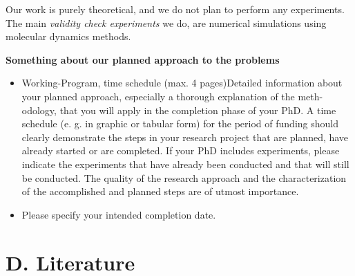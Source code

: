\documentclass[11pt, notitlepage]{article} %
\begin{document}
Our work is purely theoretical, and we do not plan to perform any experiments. The main \emph{validity check experiments} 
we do, are numerical simulations using molecular dynamics methods. 

\textbf{Something about our planned approach to the problems}

\begin{itemize}
    \item Working-Program, time schedule (max. 4 pages)Detailed information about your planned approach, especially a thorough explanation of the meth-odology, 
	that you will apply in the completion phase of your  PhD. A time schedule (e. g. in graphic or  tabular  form)  for  the  period  of  
	funding  should  clearly  demonstrate  the  steps  in  your  research  project that are planned, have already started or are completed. 
	If your PhD includes experiments, please indicate the experiments that have already been conducted and that will still be conducted. 
	The  quality  of  the  research  approach  and  the  characterization  of  the  accomplished  and  planned  steps are of utmost importance.
    \item Please specify your intended completion date.
\end{itemize}

\newpage
\section*{D. Literature}


{\small

%
}

\end{document}
